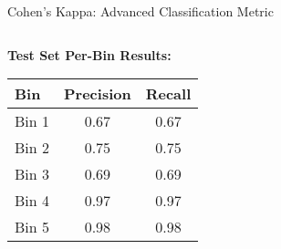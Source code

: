 \documentclass[aspectratio=169]{beamer}
\begin{document}
\begin{frame}{Cohen's Kappa: Advanced Classification Metric}
\begin{columns}
\begin{column}{0.4\textwidth}
\vspace{0.3cm}
\textbf{Test Set Per-Bin Results:}
\begin{table}[h]
\centering
\tiny
\begin{tabular}{@{}lcc@{}}
\toprule
\textbf{Bin} & \textbf{Precision} & \textbf{Recall} \\
\midrule
Bin 1 & 0.67 & 0.67 \\
Bin 2 & 0.75 & 0.75 \\
Bin 3 & 0.69 & 0.69 \\
Bin 4 & 0.97 & 0.97 \\
Bin 5 & 0.98 & 0.98 \\
\bottomrule
\end{tabular}
\end{table}
\end{column}
\end{columns}
\end{frame}
\end{document}
